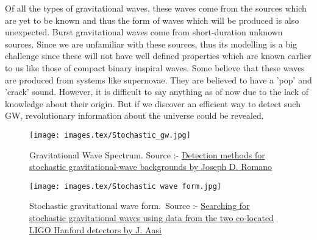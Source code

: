 \begin{enumerate}
Of all the types of gravitational waves, these waves come from the sources which are yet to be known and thus the form of waves which will be produced is also unexpected. Burst gravitational waves come from short-duration unknown sources. Since we are unfamiliar with these sources, thus its modelling is a big challenge since these will not have well defined properties which are known earlier to us like those of compact binary inspiral waves. Some believe that these waves are produced from systems like supernovae. They are believed to have a 'pop' and 'crack' sound. However, it is difficult to say anything as of now due to the lack of knowledge about their origin. But if we discover an efficient way to detect such GW, revolutionary information about the universe could be revealed.

\end{enumerate}

\begin{figure}[h]
    \centering
    \texttt{[image: images.tex/Stochastic\_gw.jpg]}
    \caption{Gravitational Wave Spectrum. Source :- \href{https://link.springer.com/article/10.1007/s41114-017-0004-1}{Detection methods for stochastic gravitational-wave backgrounds by Joseph D. Romano}}
\end{figure}

\begin{figure}[h]
    \centering
    \texttt{[image: images.tex/Stochastic wave form.jpg]}
    \caption{Stochastic gravitational wave form.\, Source :- \href{https://journals.aps.org/prd/abstract/10.1103/PhysRevD.91.022003}{Searching for stochastic gravitational waves using data from the two co-located LIGO Hanford detectors by J. Aasi}}
\end{figure}

\pagebreak
